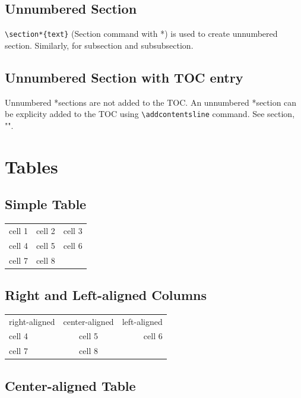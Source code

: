 	\subsection*{Unnumbered Section}
	
		\verb|\section*{text}| (Section command with *) is used to create unnumbered section. Similarly, for subsection and subsubsection.
	
	\subsection*{Unnumbered Section with TOC entry}
	\label{sec:unnumbered}
	
		Unnumbered *sections are not added to the TOC. An unnumbered *section can be explicity added to the TOC using \verb|\addcontentsline| command. See section, "".
	
\section{Tables}

	\subsection{Simple Table}
	
		\begin{tabular}{c c c}
			cell 1 & cell 2 & cell 3 \\
			cell 4 & cell 5 & cell 6 \\
			cell 7 & cell 8
		\end{tabular}
	
	\subsection{Right and Left-aligned Columns}
	
		\begin{tabular}{l c r}
			right-aligned 	& center-aligned 	& left-aligned \\
			cell 4 			& cell 5 			& cell 6 	   \\
			cell 7 			& cell 8
		\end{tabular}
	
	\subsection{Center-aligned Table}
	

